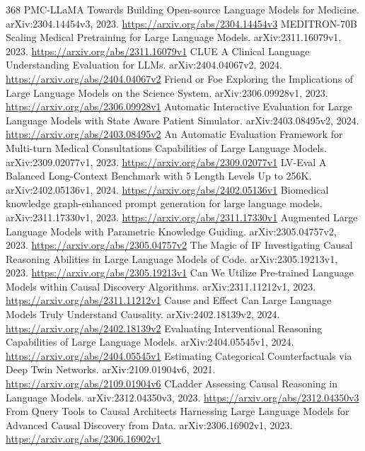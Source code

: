 \documentclass[11pt]{article}
\begin{document}
\begin{thebibliography}{368}
 PMC-LLaMA Towards Building Open-source Language Models for Medicine. arXiv:2304.14454v3, 2023. \url{https://arxiv.org/abs/2304.14454v3}
 MEDITRON-70B Scaling Medical Pretraining for Large Language Models. arXiv:2311.16079v1, 2023. \url{https://arxiv.org/abs/2311.16079v1}
 CLUE A Clinical Language Understanding Evaluation for LLMs. arXiv:2404.04067v2, 2024. \url{https://arxiv.org/abs/2404.04067v2}
 Friend or Foe Exploring the Implications of Large Language Models on the Science System. arXiv:2306.09928v1, 2023. \url{https://arxiv.org/abs/2306.09928v1}
 Automatic Interactive Evaluation for Large Language Models with State Aware Patient Simulator. arXiv:2403.08495v2, 2024. \url{https://arxiv.org/abs/2403.08495v2}
 An Automatic Evaluation Framework for Multi-turn Medical Consultations Capabilities of Large Language Models. arXiv:2309.02077v1, 2023. \url{https://arxiv.org/abs/2309.02077v1}
 LV-Eval A Balanced Long-Context Benchmark with 5 Length Levels Up to 256K. arXiv:2402.05136v1, 2024. \url{https://arxiv.org/abs/2402.05136v1}
 Biomedical knowledge graph-enhanced prompt generation for large language models. arXiv:2311.17330v1, 2023. \url{https://arxiv.org/abs/2311.17330v1}
 Augmented Large Language Models with Parametric Knowledge Guiding. arXiv:2305.04757v2, 2023. \url{https://arxiv.org/abs/2305.04757v2}
 The Magic of IF Investigating Causal Reasoning Abilities in Large Language Models of Code. arXiv:2305.19213v1, 2023. \url{https://arxiv.org/abs/2305.19213v1}
 Can We Utilize Pre-trained Language Models within Causal Discovery Algorithms. arXiv:2311.11212v1, 2023. \url{https://arxiv.org/abs/2311.11212v1}
 Cause and Effect Can Large Language Models Truly Understand Causality. arXiv:2402.18139v2, 2024. \url{https://arxiv.org/abs/2402.18139v2}
 Evaluating Interventional Reasoning Capabilities of Large Language Models. arXiv:2404.05545v1, 2024. \url{https://arxiv.org/abs/2404.05545v1}
 Estimating Categorical Counterfactuals via Deep Twin Networks. arXiv:2109.01904v6, 2021. \url{https://arxiv.org/abs/2109.01904v6}
 CLadder Assessing Causal Reasoning in Language Models. arXiv:2312.04350v3, 2023. \url{https://arxiv.org/abs/2312.04350v3}
 From Query Tools to Causal Architects Harnessing Large Language Models for Advanced Causal Discovery from Data. arXiv:2306.16902v1, 2023. \url{https://arxiv.org/abs/2306.16902v1}

\end{thebibliography}
\end{document}
